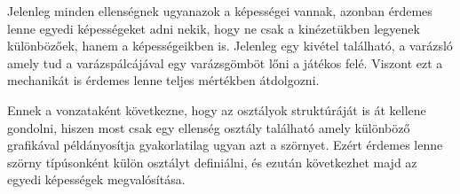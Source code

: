 Jelenleg minden ellenségnek ugyanazok a képességei vannak, azonban érdemes lenne egyedi képességeket adni nekik, hogy ne csak a kinézetükben legyenek különbözőek, hanem a képességeikben is. Jelenleg egy kivétel található, a varázsló amely tud a varázspálcájával egy varázsgömböt lőni a játékos felé. Viszont ezt a mechanikát is érdemes lenne teljes mértékben átdolgozni.

Ennek a vonzataként következne, hogy az osztályok struktúráját is át kellene gondolni, hiszen most csak egy ellenség osztály található amely különböző grafikával példányosítja gyakorlatilag ugyan azt a szörnyet. Ezért érdemes lenne szörny típúsonként külön osztályt definiálni, és ezután következhet majd az egyedi képességek megvalósítása.
